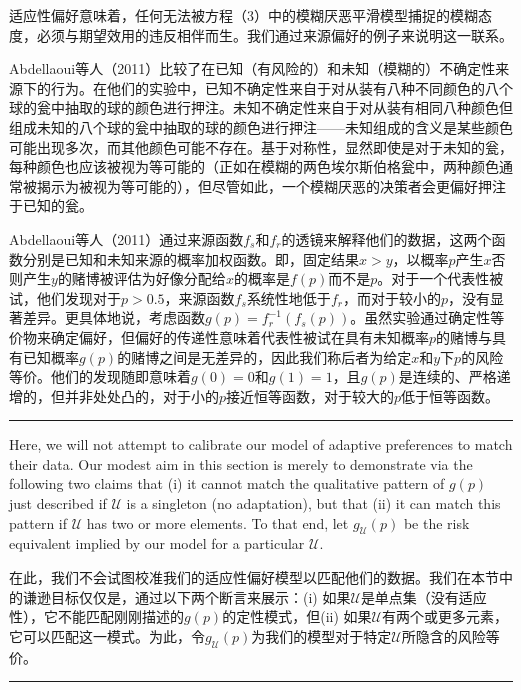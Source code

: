 \documentclass[12pt,a4paper]{article}
\newenvironment{original}
  {\par\noindent\color{black}\smallskip}
  {\par\smallskip}
\newenvironment{translation}
  {\par\noindent\color{blue!70!black}\smallskip}
  {\par\medskip\hrule\medskip}
\begin{document}
\begin{translation}
适应性偏好意味着，任何无法被方程（3）中的模糊厌恶平滑模型捕捉的模糊态度，必须与期望效用的违反相伴而生。我们通过来源偏好的例子来说明这一联系。

Abdellaoui等人（2011）比较了在已知（有风险的）和未知（模糊的）不确定性来源下的行为。在他们的实验中，已知不确定性来自于对从装有八种不同颜色的八个球的瓮中抽取的球的颜色进行押注。未知不确定性来自于对从装有相同八种颜色但组成未知的八个球的瓮中抽取的球的颜色进行押注——未知组成的含义是某些颜色可能出现多次，而其他颜色可能不存在。基于对称性，显然即使是对于未知的瓮，每种颜色也应该被视为等可能的（正如在模糊的两色埃尔斯伯格瓮中，两种颜色通常被揭示为被视为等可能的），但尽管如此，一个模糊厌恶的决策者会更偏好押注于已知的瓮。

Abdellaoui等人（2011）通过来源函数$f_s$和$f_r$的透镜来解释他们的数据，这两个函数分别是已知和未知来源的概率加权函数。即，固定结果$x > y$，以概率$p$产生$x$否则产生$y$的赌博被评估为好像分配给$x$的概率是$f(p)$而不是$p$。对于一个代表性被试，他们发现对于$p > 0.5$，来源函数$f_s$系统性地低于$f_r$，而对于较小的$p$，没有显著差异。更具体地说，考虑函数$g(p) = f_r^{-1}(f_s(p))$。虽然实验通过确定性等价物来确定偏好，但偏好的传递性意味着代表性被试在具有未知概率$p$的赌博与具有已知概率$g(p)$的赌博之间是无差异的，因此我们称后者为给定$x$和$y$下$p$的风险等价。他们的发现随即意味着$g(0) = 0$和$g(1) = 1$，且$g(p)$是连续的、严格递增的，但并非处处凸的，对于小的$p$接近恒等函数，对于较大的$p$低于恒等函数。
\end{translation}

\begin{original}
Here, we will not attempt to calibrate our model of adaptive preferences to match their data. Our modest aim in this section is merely to demonstrate via the following two claims that (i) it cannot match the qualitative pattern of $g(p)$ just described if $\mathcal{U}$ is a singleton (no adaptation), but that (ii) it can match this pattern if $\mathcal{U}$ has two or more elements. To that end, let $g_\mathcal{U}(p)$ be the risk equivalent implied by our model for a particular $\mathcal{U}$.
\end{original}
\begin{translation}
在此，我们不会试图校准我们的适应性偏好模型以匹配他们的数据。我们在本节中的谦逊目标仅仅是，通过以下两个断言来展示：(i) 如果$\mathcal{U}$是单点集（没有适应性），它不能匹配刚刚描述的$g(p)$的定性模式，但(ii) 如果$\mathcal{U}$有两个或更多元素，它可以匹配这一模式。为此，令$g_\mathcal{U}(p)$为我们的模型对于特定$\mathcal{U}$所隐含的风险等价。
\end{translation}
\end{document}
